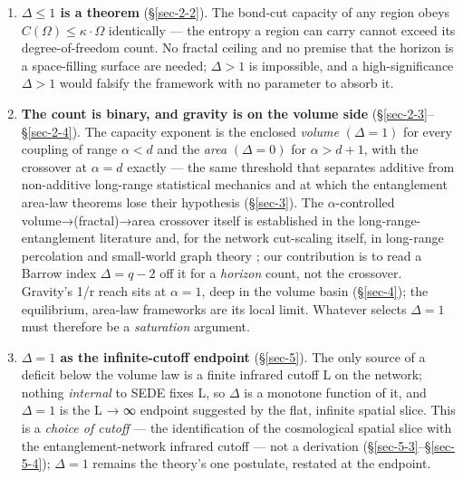 \documentclass[12pt]{iopart}
\providecommand{\tightlist}{\setlength{\itemsep}{0pt}\setlength{\parskip}{0pt}}
\begin{document}
\begin{enumerate}
\def\labelenumi{\arabic{enumi}.}
\tightlist
\item
  \textbf{\(\Delta  \leq  1\) is a theorem} (§\ref{sec-2-2}). The
  bond-cut capacity of any region obeys
  \(C(\Omega ) \leq  \kappa \cdot\)\textbar{}\(\Omega\)\textbar{}
  identically --- the entropy a region can carry cannot exceed its
  degree-of-freedom count. No fractal ceiling and no premise that the
  horizon is a space-filling surface are needed; \(\Delta  > 1\) is
  impossible, and a high-significance \(\Delta  > 1\) would falsify the
  framework with no parameter to absorb it.
\item
  \textbf{The count is binary, and gravity is on the volume side}
  (§\ref{sec-2-3}--§\ref{sec-2-4}). The capacity exponent is the
  enclosed \emph{volume} \((\Delta  = 1)\) for every coupling of range
  \(\alpha  < d\) and the \emph{area} \((\Delta  = 0)\) for
  \(\alpha  > d+1\), with the crossover at \(\alpha  = d\) exactly ---
  the same threshold that separates additive from non-additive
  long-range statistical mechanics and at which the entanglement
  area-law theorems \citep{Eisert:2008ur} lose their hypothesis
  (§\ref{sec-3}). The \(\alpha\)-controlled volume→(fractal)→area
  crossover itself is established in the long-range-entanglement
  literature
  \citep{Vitagliano:2010db, Solfanelli:2023vav, Chakraborty:2023mrw}
  and, for the network cut-scaling itself, in long-range percolation and
  small-world graph theory
  \citep{BenjaminiBerger:2001, Biskup:2004, Kleinberg:2000}; our
  contribution is to read a Barrow index \(\Delta  = q - 2\) off it for
  a \emph{horizon} count, not the crossover. Gravity's 1/r reach sits at
  \(\alpha  = 1\), deep in the volume basin (§\ref{sec-4}); the
  equilibrium, area-law frameworks are its local limit. Whatever selects
  \(\Delta  = 1\) must therefore be a \emph{saturation} argument.
\item
  \textbf{\(\Delta  = 1\) as the infinite-cutoff endpoint}
  (§\ref{sec-5}). The only source of a deficit below the volume law is a
  finite infrared cutoff L on the network; nothing \emph{internal} to
  SEDE fixes L, so \(\Delta\) is a monotone function of it, and
  \(\Delta  = 1\) is the L → ∞ endpoint suggested by the flat, infinite
  spatial slice. This is a \emph{choice of cutoff} --- the
  identification of the cosmological spatial slice with the
  entanglement-network infrared cutoff --- not a derivation
  (§\ref{sec-5-3}--§\ref{sec-5-4}); \(\Delta  = 1\) remains the theory's
  one postulate, restated at the endpoint.
\end{enumerate}
\end{document}
